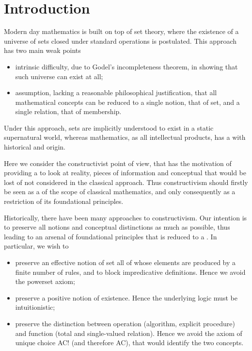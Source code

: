 
\section{Introduction}

Modern day mathematics is built on top of set theory, where the existence of a
universe of sets closed under standard operations is postulated. This approach
has two main weak points

\begin{itemize}
\item intrinsic difficulty, due to Godel's incompleteness theorem, in showing
  that such universe can exist at all;
\item assumption, lacking a reasonable philosophical justification, that all
  mathematical concepts can be reduced to a single notion, that of set, and a
  single relation, that of membership.
\end{itemize}

Under this approach, sets are implicitly understood to exist in a static
supernatural world, whereas mathematics, as all intellectual products, has a
 with historical and  origin.

Here we consider the constructivist point of view, that has the motivation of
providing a  to look at reality,  pieces
of information and conceptual  that would be lost of not
considered in the classical approach. Thus constructivism should firstly be seen
as a  of the scope of classical mathematics, and only
consequently as a restriction of its foundational principles.

Historically, there have been many approaches to constructivism. Our intention
is to preserve all notions and conceptual distinctions as much as possible, thus
leading to an arsenal of foundational principles that is reduced to a
. In particular, we wish to

\begin{itemize}
\item preserve an effective notion of set all of whose elements are produced by
  a finite number of rules, and to block impredicative definitions. Hence we
  avoid the powerset axiom;
\item preserve a positive notion of existence. Hence the underlying logic must
  be intuitionistic;
\item preserve the distinction between operation (algorithm, explicit procedure)
  and function (total and single-valued relation). Hence we avoid the axiom of
  unique choice AC! (and therefore AC), that would identify the two concepts.
\end{itemize}

